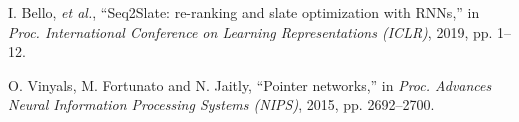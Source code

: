 \documentclass[journal]{IEEEtran}
\begin{document}
\begin{thebibliography}{1}
		
		
		
		
		
	
		
		


	
		
		
		


         I. Bello, \emph{et al.}, ``Seq2Slate: re-ranking and slate optimization with RNNs,'' in \emph{Proc. International Conference on Learning Representations (ICLR)}, 2019, pp. 1--12.


         O. Vinyals, M. Fortunato and N. Jaitly, ``Pointer networks,'' in \emph{Proc. Advances Neural Information Processing Systems (NIPS)}, 2015, pp. 2692--2700.



\end{thebibliography}
\end{document}

